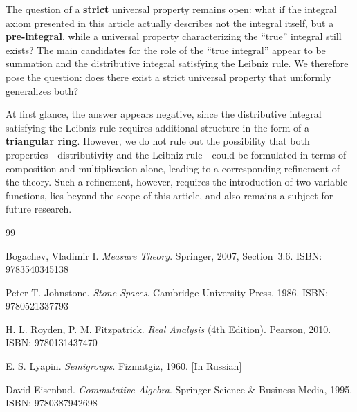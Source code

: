 \documentclass[12pt]{article}
\theoremstyle{definition}
\begin{document}
\vspace{5pt}
The question of a \textbf{strict} universal property remains open: 
what if the integral axiom presented in this article actually describes not the 
integral itself, but a \textbf{pre-integral}, while a universal property 
characterizing the ``true'' integral still exists? The main candidates for 
the role of the ``true integral'' appear to be summation and the 
distributive integral satisfying the Leibniz rule. We therefore pose 
the question: does there exist a strict universal property that uniformly 
generalizes both?

\vspace{5pt}
At first glance, the answer appears negative, since the distributive integral 
satisfying the Leibniz rule requires additional structure in the form of a 
\textbf{triangular ring}. However, we do not rule out the possibility that 
both properties—distributivity and the Leibniz rule—could be formulated 
in terms of composition and multiplication alone, leading to a corresponding refinement of the theory. 
Such a refinement, however, requires the introduction of two-variable 
functions, lies beyond the scope of this article, and also remains a subject 
for future research.

\newpage

\renewcommand{\refname}{Bibliography} 

\begin{thebibliography}{99}

Bogachev, Vladimir I. 
\textit{Measure Theory}. 
Springer, 2007, Section~3.6. 
ISBN: 9783540345138

Peter T. Johnstone.
\textit{Stone Spaces}.
Cambridge University Press, 1986.
ISBN: 9780521337793

H. L. Royden, P. M. Fitzpatrick.
\textit{Real Analysis} (4th Edition).
Pearson, 2010.
ISBN: 9780131437470

E. S. Lyapin.
\textit{Semigroups}.
Fizmatgiz, 1960. [In Russian]

David Eisenbud.
\textit{Commutative Algebra}.
Springer Science \& Business Media, 1995.
ISBN: 9780387942698

\end{thebibliography}
\end{document}
